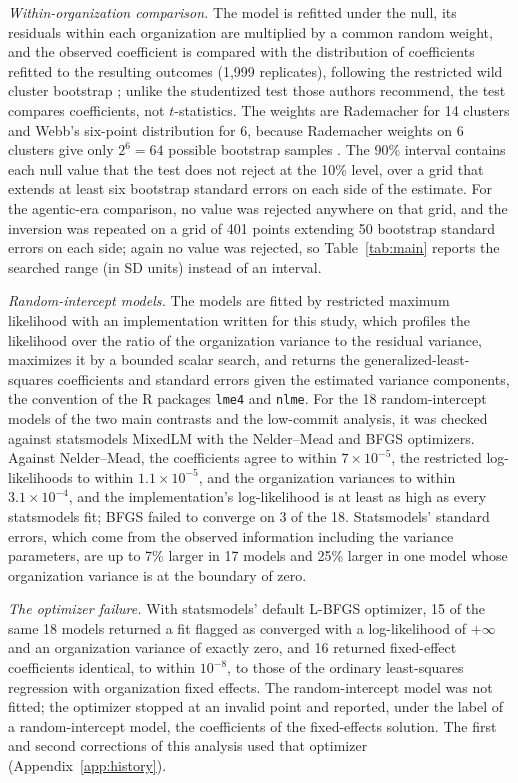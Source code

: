 \documentclass[acmsmall,screen,review,anonymous]{acmart}
\begin{document}
\textit{Within-organization comparison.} The model is refitted under the null, its residuals within each organization are multiplied by a common random weight, and the observed coefficient is compared with the distribution of coefficients refitted to the resulting outcomes (1,999 replicates), following the restricted wild cluster bootstrap \citep{cameron2008bootstrap, roodman2019boottest}; unlike the studentized test those authors recommend, the test compares coefficients, not $t$-statistics. The weights are Rademacher for 14 clusters and Webb's six-point distribution for 6, because Rademacher weights on 6 clusters give only $2^6 = 64$ possible bootstrap samples \citep{webb2023reworking, roodman2019boottest}. The 90\% interval contains each null value that the test does not reject at the 10\% level, over a grid that extends at least six bootstrap standard errors on each side of the estimate. For the agentic-era comparison, no value was rejected anywhere on that grid, and the inversion was repeated on a grid of 401 points extending 50 bootstrap standard errors on each side; again no value was rejected, so Table~\ref{tab:main} reports the searched range (in SD units) instead of an interval.

\textit{Random-intercept models.} The models are fitted by restricted maximum likelihood with an implementation written for this study, which profiles the likelihood over the ratio of the organization variance to the residual variance, maximizes it by a bounded scalar search, and returns the generalized-least-squares coefficients and standard errors given the estimated variance components, the convention of the R packages \texttt{lme4} and \texttt{nlme}. For the 18 random-intercept models of the two main contrasts and the low-commit analysis, it was checked against statsmodels MixedLM with the Nelder--Mead and BFGS optimizers. Against Nelder--Mead, the coefficients agree to within $7 \times 10^{-5}$, the restricted log-likelihoods to within $1.1 \times 10^{-5}$, and the organization variances to within $3.1 \times 10^{-4}$, and the implementation's log-likelihood is at least as high as every statsmodels fit; BFGS failed to converge on 3 of the 18. Statsmodels' standard errors, which come from the observed information including the variance parameters, are up to 7\% larger in 17 models and 25\% larger in one model whose organization variance is at the boundary of zero.

\textit{The optimizer failure.} With statsmodels' default L-BFGS optimizer, 15 of the same 18 models returned a fit flagged as converged with a log-likelihood of $+\infty$ and an organization variance of exactly zero, and 16 returned fixed-effect coefficients identical, to within $10^{-8}$, to those of the ordinary least-squares regression with organization fixed effects. The random-intercept model was not fitted; the optimizer stopped at an invalid point and reported, under the label of a random-intercept model, the coefficients of the fixed-effects solution. The first and second corrections of this analysis used that optimizer (Appendix~\ref{app:history}).
\end{document}
